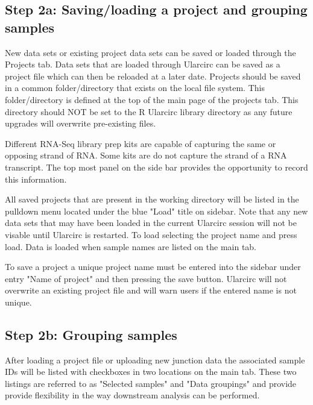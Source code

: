 \documentclass[12pt]{article}\usepackage[]{graphicx}\usepackage[]{color}
\begin{document}
\subsection{Step 2a: Saving/loading a project and grouping samples} \label{sec:Step2}
\indent New data sets or existing project data sets can be saved or loaded through the Projects tab. Data sets that are loaded through Ularcirc can be saved as a project file which can then be reloaded at a later date. Projects should be saved in a common folder/directory that exists on the local file system. This folder/directory is defined at the top of the  main page of the projects tab. This directory should NOT be set to the R Ularcirc library  directory as any future upgrades will overwrite pre-existing files. \par

Different RNA-Seq library prep kits are capable of capturing the same or opposing strand of RNA. Some kits are do not capture the strand of a RNA transcript. The top most panel on the side bar provides the opportunity to record this information. \par

All saved projects that are present in the working directory will be listed in the pulldown menu located under the blue "Load" title on sidebar. Note that any new data sets that may have been loaded in the current Ularcirc session will not be visable until Ularcirc is restarted. To load selecting the project name and press load. Data is loaded when sample names are listed on the main tab. \par

To save a project a unique project name must be entered into the sidebar under entry "Name of project" and then pressing the save button. Ularcirc will not overwrite an existing project file and will warn users if the entered name is not unique.
\subsection{Step 2b: Grouping samples} \label{sec:Step2}

\indent After loading a project file or uploading new junction data the associated sample IDs will be listed with checkboxes in two locations on the main tab. These two listings are referred to as "Selected samples" and "Data groupings" and provide provide flexibility in the way downstream analysis can be performed. \par
\end{document}

